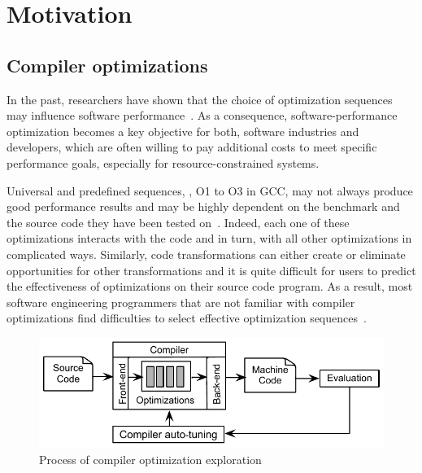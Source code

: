 
\section{Motivation}
\label{sec:comp-motiv}
\subsection{Compiler optimizations}

In the past, researchers have shown that the choice of optimization sequences may influence software performance~\cite{almagor2004finding,chen2012deconstructing}. 
As a consequence, software-performance optimization becomes a key objective for both, software industries and developers, which are often willing to pay additional costs to meet specific performance goals, especially for resource-constrained systems.

Universal and predefined sequences, \eg, O1 to O3 in GCC, may not always produce good performance results and may be highly dependent on the benchmark and the source code they have been tested on~\cite{hoste2008cole,chen2010evaluating,escobar2015evaluation}.
Indeed, each one of these optimizations interacts with the code and in turn, with all other optimizations in complicated ways. Similarly, code transformations can either create or eliminate opportunities for other transformations and it is quite difficult for users to predict the effectiveness of optimizations on their source code program.
As a result, most software engineering programmers that are not familiar with compiler optimizations find difficulties to select effective optimization sequences~\cite{almagor2004finding}.

\begin{figure}[ht]
	\centering
	\includegraphics[width=0.9\linewidth]{chapitre3/fig/autotuning.pdf}
	\caption{Process of compiler optimization exploration}
	\label{fig:autotuning.pdf}
\end{figure}

